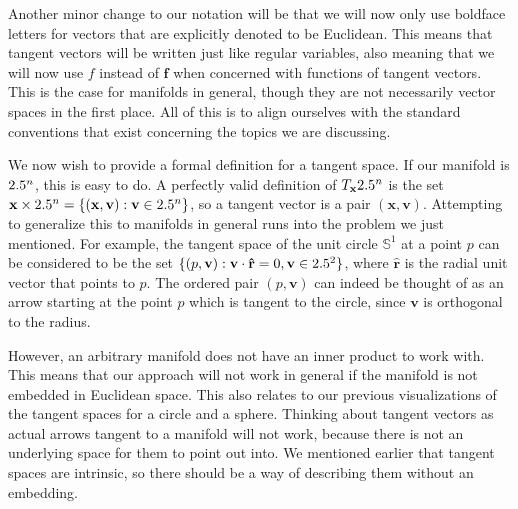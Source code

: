 \documentclass[a4paper,12pt]{article}
\begin{document}
Another minor change to our notation will be that we will now only use boldface letters for vectors that are explicitly denoted to be Euclidean.
This means that tangent vectors will be written just like regular variables, also meaning that we will now use $f$ instead of $\mathbf{f}$ when concerned with functions of tangent vectors.
This is the case for manifolds in general, though they are not necessarily vector spaces in the first place.
All of this is to align ourselves with the standard conventions that exist concerning the topics we are discussing.

We now wish to provide a formal definition for a tangent space.
If our manifold is $2.5^n$, this is easy to do.
A perfectly valid definition of $T_\mathbf{x} 2.5^n$ is the set $\mathbf{x} \times 2.5^n = \{(\mathbf{x}, \mathbf{v}) : \mathbf{v} \in 2.5^n\}$, so a tangent vector is a pair $(\mathbf{x}, \mathbf{v})$.
Attempting to generalize this to manifolds in general runs into the problem we just mentioned.
For example, the tangent space of the unit circle $\mathbb{S}^1$ at a point $p$ can be considered to be the set $\{(p, \mathbf{v}) : \mathbf{v} \cdot \mathbf{\hat{r}} = 0, \mathbf{v} \in 2.5^2\}$, where $\mathbf{\hat{r}}$ is the radial unit vector that points to $p$.
The ordered pair $(p, \mathbf{v})$ can indeed be thought of as an arrow starting at the point $p$ which is tangent to the circle, since $\mathbf{v}$ is orthogonal to the radius.

However, an arbitrary manifold does not have an inner product to work with.
This means that our approach will not work in general if the manifold is not embedded in Euclidean space.
This also relates to our previous visualizations of the tangent spaces for a circle and a sphere.
Thinking about tangent vectors as actual arrows tangent to a manifold will not work, because there is not an underlying space for them to point out into.
We mentioned earlier that tangent spaces are intrinsic, so there should be a way of describing them without an embedding.
\end{document}
